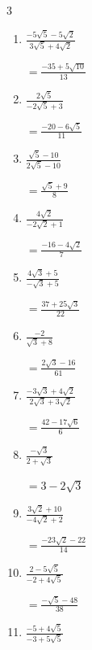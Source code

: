 \begin{multicols}{3}
\begin{enumerate}
        $\displaystyle =\frac{4-6\sqrt{2}}{7}$

  \item $\displaystyle \frac{-5\sqrt{5}-5\sqrt{2}}{3\sqrt{5}+4\sqrt{2}}$

        $\displaystyle =\frac{-35+5\sqrt{10}}{13}$

  \item $\displaystyle \frac{2\sqrt{5}}{-2\sqrt{5}+3}$

        $\displaystyle =\frac{-20-6\sqrt{5}}{11}$

  \item $\displaystyle \frac{\sqrt{5}-10}{2\sqrt{5}-10}$

        $\displaystyle =\frac{\sqrt{5}+9}{8}$

  \item $\displaystyle \frac{4\sqrt{2}}{-2\sqrt{2}+1}$

        $\displaystyle =\frac{-16-4\sqrt{2}}{7}$

\columnbreak %

  \item $\displaystyle \frac{4\sqrt{3}+5}{-\sqrt{3}+5}$

        $\displaystyle =\frac{37+25\sqrt{3}}{22}$

  \item $\displaystyle \frac{-2}{\sqrt{3}+8}$

        $\displaystyle =\frac{2\sqrt{3}-16}{61}$

  \item $\displaystyle \frac{-3\sqrt{3}+4\sqrt{2}}{2\sqrt{3}+3\sqrt{2}}$

        $\displaystyle =\frac{42-17\sqrt{6}}{6}$

  \item $\displaystyle \frac{-\sqrt{3}}{2+\sqrt{3}}$

        $\displaystyle =3-2\sqrt{3}$

  \item $\displaystyle \frac{3\sqrt{2}+10}{-4\sqrt{2}+2}$

        $\displaystyle =\frac{-23\sqrt{2}-22}{14}$

\columnbreak %

\resetques

  \item $\displaystyle \frac{2-5\sqrt{5}}{-2+4\sqrt{5}}$

        $\displaystyle =\frac{-\sqrt{5}-48}{38}$

  \item $\displaystyle \frac{-5+4\sqrt{5}}{-3+5\sqrt{5}}$


\end{enumerate}
\end{multicols}
